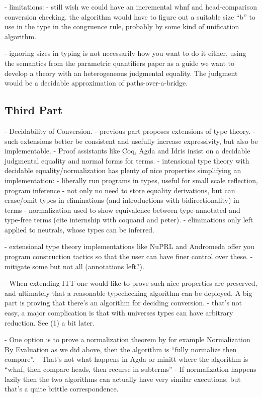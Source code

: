 \documentclass{article}
\begin{document}
   - limitations:
     - still wish we could have an incremental whnf and
     head-comparison conversion checking. the algorithm would have to
     figure out a suitable size ``b'' to use in the type in the
     congruence rule, probably by some kind of unification algorithm.
     
     - ignoring sizes in typing is not necessarily how you want to do
     it either, using the semantics from the parametric quantifiers
     paper as a guide we want to develop a theory with an
     heterogeneous judgmental equality.
     The judgment would be a decidable approximation of
     paths-over-a-bridge.

\subsection{Third Part}
- Decidability of Conversion.
 - previous part proposes extensions of type theory.
 - such extensions better be consistent and usefully increase expressivity, but also be implementable.
 - Proof assistants like Coq, Agda and Idris insist on a decidable judgmental equality and normal forms for terms. 
 - intensional type theory with decidable equality/normalization has plenty of nice properties simplifying an implementation:
   - liberally run programs in types, useful for small scale reflection, program inference
   - not only no need to store equality derivations, but can erase/omit types in eliminations (and introductions with bidirectionality) in terms
      - normalization used to show equivalence between type-annotated and type-free terms (cite internship with coquand and peter).
         - eliminations only left applied to neutrals, whose types can be inferred.

   - extensional type theory implementations like NuPRL and Andromeda
   offer you program construction tactics so that the user can have finer control over these.
    - mitigate some but not all (annotations left?).

 - When extending ITT one would like to prove such nice properties are
 preserved, and ultimately that a reasonable typechecking algorithm
 can be deployed. A big part is proving that there's an algorithm for
 deciding conversion.
   - that's not easy, a major complication is that with universes types can have arbitrary reduction. See (1) a bit later.
 
 - One option is to prove a normalization theorem by for example
 Normalization By Evaluation as we did above, then the algorithm is ``fully normalize then compare''.
   - That's not what happens in Agda or minitt where the algorithm is ``whnf, then compare heads, then recurse in subterms''
   - If normalization happens lazily then the two algorithms can actually have very similar executions, but that's a quite brittle correspondence.
   
\end{document}
